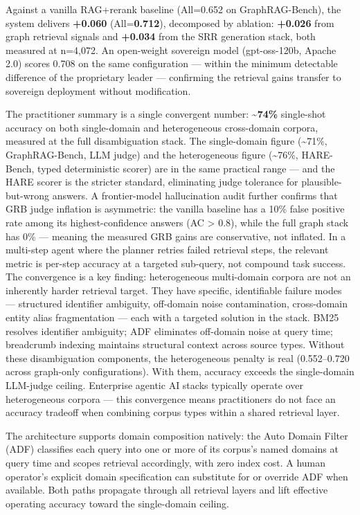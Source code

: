 \documentclass[
]{article}
\begin{document}
Against a vanilla RAG+rerank baseline (All=0.652 on GraphRAG-Bench), the
system delivers \textbf{+0.060} (All=\textbf{0.712}), decomposed by
ablation: \textbf{+0.026} from graph retrieval signals and
\textbf{+0.034} from the SRR generation stack, both measured at n=4,072.
An open-weight sovereign model (gpt-oss-120b, Apache 2.0) scores 0.708
on the same configuration --- within the minimum detectable difference
of the proprietary leader --- confirming the retrieval gains transfer to
sovereign deployment without modification.

The practitioner summary is a single convergent number:
\textbf{\textasciitilde74\%} single-shot accuracy on both single-domain
and heterogeneous cross-domain corpora, measured at the full
disambiguation stack. The single-domain figure (\textasciitilde71\%,
GraphRAG-Bench, LLM judge) and the heterogeneous figure
(\textasciitilde76\%, HARE-Bench, typed deterministic scorer) are in the
same practical range --- and the HARE scorer is the stricter standard,
eliminating judge tolerance for plausible-but-wrong answers. A
frontier-model hallucination audit further confirms that GRB judge
inflation is asymmetric: the vanilla baseline has a 10\% false positive
rate among its highest-confidence answers (AC \textgreater{} 0.8), while
the full graph stack has 0\% --- meaning the measured GRB gains are
conservative, not inflated. In a multi-step agent where the planner
retries failed retrieval steps, the relevant metric is per-step accuracy
at a targeted sub-query, not compound task success. The convergence is a
key finding: heterogeneous multi-domain corpora are not an inherently
harder retrieval target. They have specific, identifiable failure modes
--- structured identifier ambiguity, off-domain noise contamination,
cross-domain entity alias fragmentation --- each with a targeted
solution in the stack. BM25 resolves identifier ambiguity; ADF
eliminates off-domain noise at query time; breadcrumb indexing maintains
structural context across source types. Without these disambiguation
components, the heterogeneous penalty is real (0.552--0.720 across
graph-only configurations). With them, accuracy exceeds the
single-domain LLM-judge ceiling. Enterprise agentic AI stacks typically
operate over heterogeneous corpora --- this convergence means
practitioners do not face an accuracy tradeoff when combining corpus
types within a shared retrieval layer.

The architecture supports domain composition natively: the Auto Domain
Filter (ADF) classifies each query into one or more of its corpus's
named domains at query time and scopes retrieval accordingly, with zero
index cost. A human operator's explicit domain specification can
substitute for or override ADF when available. Both paths propagate
through all retrieval layers and lift effective operating accuracy
toward the single-domain ceiling.
\end{document}
